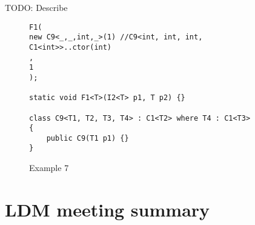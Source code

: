 TODO: Describe
\begin{figure}[h]
\begin{lstlisting}[style=csharp, showstringspaces=false]
F1(
new C9<_,_,int,_>(1) //C9<int, int, int, C1<int>>..ctor(int)
,
1
);

static void F1<T>(I2<T> p1, T p2) {}

class C9<T1, T2, T3, T4> : C1<T2> where T4 : C1<T3>
{
    public C9(T1 p1) {}
}
\end{lstlisting}
\caption{Example 7}
\label{img79:example7}
\end{figure}

\section{LDM meeting summary}